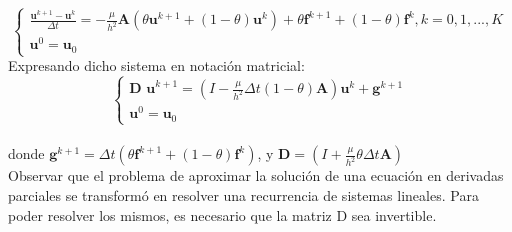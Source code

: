 \documentclass{endm}
\begin{document}
\begin{equation} \label{NEOTHETA}
    \begin{cases}
        \frac{\textbf{u}^{k+1} - \textbf{u}^{k}}{\Delta t} = - \frac{\mu}{h^2} \textbf{A}(\theta \textbf{u}^{k+1} + (1 - \theta)\textbf{u}^k) + \theta \textbf{f}^{k+1} + (1-\theta)\textbf{f}^k, k = 0, 1, ..., K\\
        \textbf{u}^0 = \textbf{u}_0
    \end{cases}
\end{equation}
Expresando dicho sistema en notaci\'on matricial:
\begin{equation} \label{FINALSYS}
    \begin{cases}
        \textbf{D u}^{k+1} = (I - \frac{\mu}{h^2} \Delta t (1-\theta) \textbf{A})\textbf{u}^k + \textbf{g}^{k+1}\\
        \textbf{u}^0 = \textbf{u}_0
    \end{cases}
\end{equation}\\

donde $\textbf{g}^{k+1} = \Delta t (\theta \textbf{f}^{k+1} + (1-\theta)\textbf{f}^{k})$, y $\textbf{D} = (I + \frac{\mu}{h^2} \theta \Delta t \textbf{A})$\\

Observar que el problema de aproximar la soluci\'on de una ecuaci\'on en derivadas parciales se transform\'o en resolver una recurrencia de sistemas lineales. Para poder resolver los mismos, es necesario que la matriz D sea invertible.\\
\end{document}

